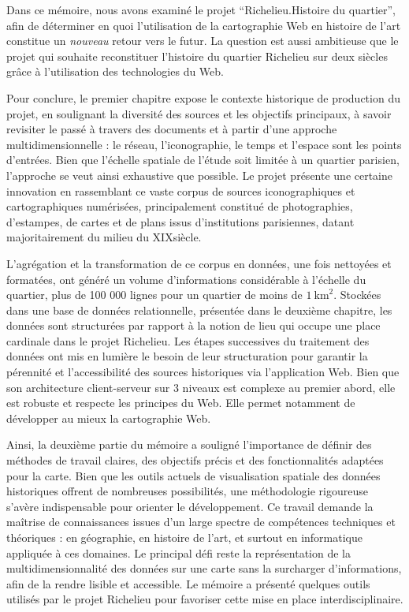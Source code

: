 Dans ce mémoire, nous avons examiné le projet \enquote{Richelieu.Histoire du quartier}, afin de déterminer en quoi l'utilisation de la cartographie Web en histoire de l'art constitue un \textit{nouveau} retour vers le futur. La question est aussi ambitieuse que le projet qui souhaite reconstituer l'histoire du quartier Richelieu sur deux siècles grâce à l'utilisation des technologies du Web. 

Pour conclure, le premier chapitre expose le contexte historique de production du projet, en soulignant la diversité des sources et les objectifs principaux, à savoir revisiter le passé à travers des documents et à partir d'une approche multidimensionnelle : le réseau, l'iconographie, le temps et l'espace sont les points d'entrées. Bien que l’échelle spatiale de l’étude soit limitée à un quartier parisien, l'approche se veut ainsi exhaustive que possible. Le projet présente une certaine innovation en rassemblant ce vaste corpus de sources iconographiques et cartographiques numérisées, principalement constitué de photographies, d’estampes, de cartes et de plans issus d’institutions parisiennes, datant majoritairement du milieu du XIX\ieme  siècle. 

L'agrégation et la transformation de ce corpus en données, une fois nettoyées et formatées, ont généré un volume d'informations considérable à l’échelle du quartier, plus de 100 000 lignes pour un quartier de moins de $1~\text{km}^2$. Stockées dans une base de données relationnelle, présentée dans le deuxième chapitre, les données sont structurées par rapport à la notion de lieu qui occupe une place cardinale dans le projet Richelieu. Les étapes successives du traitement des données ont mis en lumière le besoin de leur structuration pour garantir la pérennité et l’accessibilité des sources historiques via l'application Web. Bien que son architecture client-serveur sur 3 niveaux est complexe au premier abord, elle est robuste et respecte les principes du Web. Elle permet notamment de développer au mieux la cartographie Web. 

Ainsi, la deuxième partie du mémoire a souligné l'importance de définir des méthodes de travail claires, des objectifs précis et des fonctionnalités adaptées pour la carte. Bien que les outils actuels de visualisation spatiale des données historiques offrent de nombreuses possibilités, une méthodologie rigoureuse s'avère indispensable pour orienter le développement. Ce travail demande la maîtrise de connaissances issues d'un large spectre de compétences techniques et théoriques : en géographie, en histoire de l'art, et surtout en informatique appliquée à ces domaines. Le principal défi reste la représentation de  la multidimensionnalité des données sur une carte sans la surcharger d'informations, afin de la rendre lisible et accessible. Le mémoire a présenté quelques outils utilisés par le projet Richelieu pour favoriser cette mise en place interdisciplinaire. 

